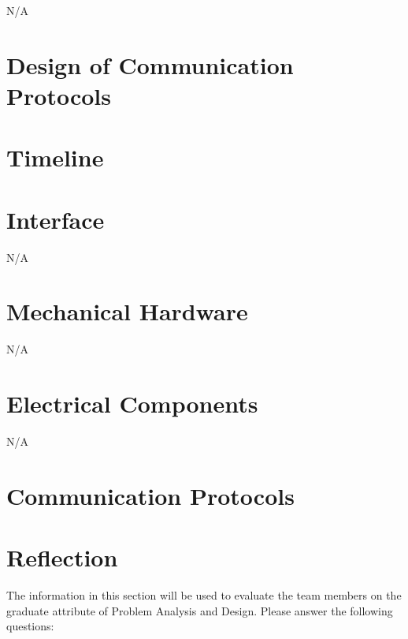 \documentclass[12pt, titlepage]{article}
\begin{document}
N/A

\section{Design of Communication Protocols}

\section{Timeline}


% 

\newpage{}

\appendix

\section{Interface} 

N/A 

\section{Mechanical Hardware}

N/A

\section{Electrical Components}

N/A

\section{Communication Protocols}

\section{Reflection}

The information in this section will be used to evaluate the team members on the
graduate attribute of Problem Analysis and Design.  Please answer the following questions:
\end{document}
